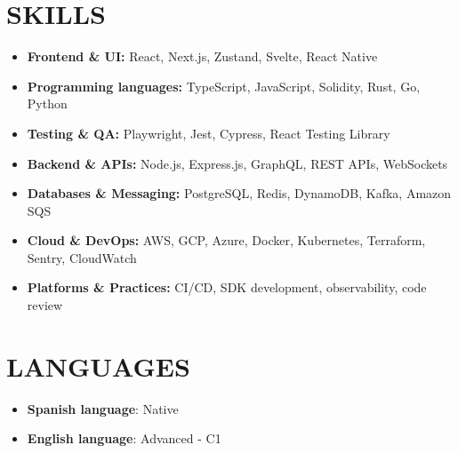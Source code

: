 \documentclass{article}
\begin{document}
\section*{SKILLS}
\begin{itemize}
	\item \textbf{Frontend \& UI:} React, Next.js, Zustand, Svelte, React Native
	\item \textbf{Programming languages:} TypeScript, JavaScript, Solidity, Rust, Go, Python
	\item \textbf{Testing \& QA:} Playwright, Jest, Cypress, React Testing Library
	\item \textbf{Backend \& APIs:} Node.js, Express.js, GraphQL, REST APIs, WebSockets
	\item \textbf{Databases \& Messaging:} PostgreSQL, Redis, DynamoDB, Kafka, Amazon SQS
	\item \textbf{Cloud \& DevOps:} AWS, GCP, Azure, Docker, Kubernetes, Terraform, Sentry, CloudWatch
	\item \textbf{Platforms \& Practices:} CI/CD, SDK development, observability, code review
\end{itemize}

\section*{LANGUAGES}
\begin{itemize}[left=0pt]
	\item \textbf{Spanish language}: Native
	\item \textbf{English language}: Advanced {-} C1
\end{itemize}
\end{document}
